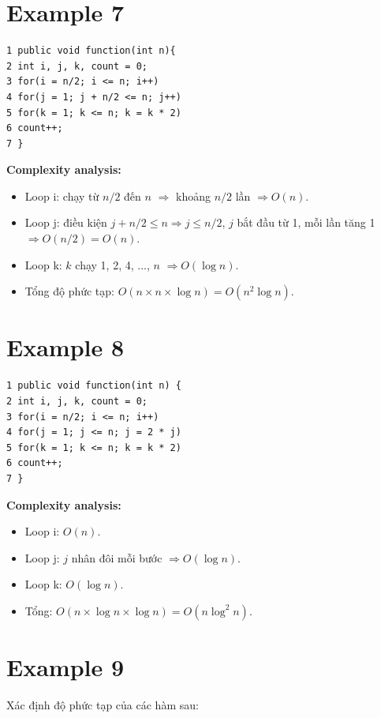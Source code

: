 \documentclass[12pt,a4paper]{article}
\begin{document}
\section*{Example 7}
\begin{verbatim}
1 public void function(int n){
2 int i, j, k, count = 0;
3 for(i = n/2; i <= n; i++)
4 for(j = 1; j + n/2 <= n; j++)
5 for(k = 1; k <= n; k = k * 2)
6 count++;
7 }
\end{verbatim}

\textbf{Complexity analysis:}
\begin{itemize}
    \item Loop i: chạy từ $n/2$ đến $n$ $\Rightarrow$ khoảng $n/2$ lần $\Rightarrow O(n)$.
    \item Loop j: điều kiện $j + n/2 \le n \Rightarrow j \le n/2$, $j$ bắt đầu từ 1, mỗi lần tăng 1 $\Rightarrow O(n/2) = O(n)$.
    \item Loop k: $k$ chạy 1, 2, 4, ..., $n$ $\Rightarrow O(\log n)$.
    \item Tổng độ phức tạp: $O(n \times n \times \log n) = O(n^2 \log n)$.
\end{itemize}

\section*{Example 8}
\begin{verbatim}
1 public void function(int n) {
2 int i, j, k, count = 0;
3 for(i = n/2; i <= n; i++)
4 for(j = 1; j <= n; j = 2 * j)
5 for(k = 1; k <= n; k = k * 2)
6 count++;
7 }
\end{verbatim}

\textbf{Complexity analysis:}
\begin{itemize}
    \item Loop i: $O(n)$.
    \item Loop j: $j$ nhân đôi mỗi bước $\Rightarrow O(\log n)$.
    \item Loop k: $O(\log n)$.
    \item Tổng: $O(n \times \log n \times \log n) = O(n \log^2 n)$.
\end{itemize}

\section*{Example 9}
Xác định độ phức tạp của các hàm sau:
\end{document}
